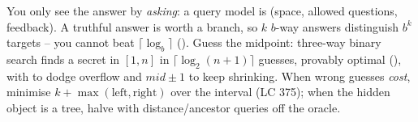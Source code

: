 \begin{recallbox}
You only see the answer by \emph{asking}: a query model is (space, allowed questions, feedback). A
truthful answer is worth a branch, so $k$ $b$-way answers distinguish $b^{k}$ targets -- you cannot
beat $\lceil\log_b\rceil$ (). Guess the midpoint: three-way binary search finds a
secret in $[1,n]$ in $\lceil\log_2(n{+}1)\rceil$ guesses, provably optimal (), with
 to dodge  overflow and $\mathit{mid}\pm1$ to keep shrinking. When
wrong guesses \emph{cost}, minimise $k+\max(\text{left},\text{right})$ over the interval (LC 375); when
the hidden object is a tree, halve with distance/ancestor queries off the  oracle.
\end{recallbox}
